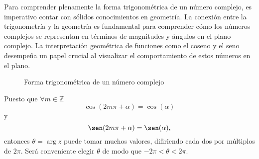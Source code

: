 Para comprender plenamente la forma trigonométrica de un número complejo, es imperativo contar con sólidos conocimientos en geometría. La conexión entre la trigonometría y la geometría es fundamental para comprender cómo los números complejos se representan en términos de magnitudes y ángulos en el plano complejo. La interpretación geométrica de funciones como el coseno y el seno desempeña un papel crucial al visualizar el comportamiento de estos números en el plano.
\begin{figure}[h!]
    \centering
    \caption{Forma trigonométrica de un número complejo}
\end{figure}

Puesto que $\forall m \in \mathbb{Z}$
$$\cos (2m\pi + \alpha ) = \cos (\alpha)$$
y
$$\sen (2m\pi + \alpha) = \sen (\alpha),$$
entonces $\theta = \arg z$ puede tomar muchos valores, difiriendo cada dos por múltiplos de $2\pi$. Será conveniente elegir $\theta$ de modo que $-2\pi < \theta < 2\pi$.

